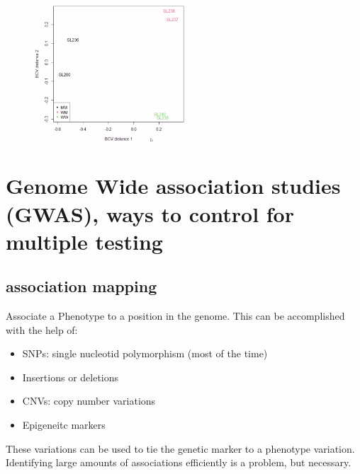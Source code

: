 \documentclass{article}
\begin{document}
\begin{figure}
\centering
\includegraphics[width= 0.5\textwidth]{lab6-exp-design/mdsplot.png}
\end{figure}



\vfill

\section{Genome Wide association studies (GWAS), ways to control for multiple testing}
\subsection{association mapping}
Associate a Phenotype to a position in the genome. This can be accomplished with the help of:
\begin{itemize}
\item SNPs: single nucleotid polymorphism (most of the time)
\item Insertions or deletions 
\item CNVs: copy number variations
\item Epigeneitc markers
\end{itemize}
These variations can be used to tie the genetic marker to a phenotype variation. Identifying large amounts of associations efficiently is a problem, but necessary.
\end{document}
